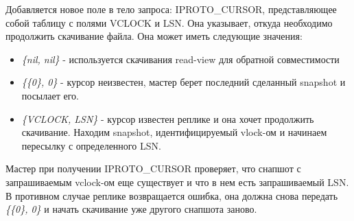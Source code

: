 Добавляется новое поле в тело запроса: IPROTO\_CURSOR, представляющее собой таблицу с полями VCLOCK и LSN. Она указывает, откуда необходимо продолжить скачивание файла. Она может иметь следующие значения:

\begin{itemize}
    \item \textit{\{nil, nil\}} - используется скачивания read-view для обратной совместимости
    \item \textit{\{\{0\}, 0\}} - курсор неизвестен, мастер берет последний сделанный snapshot и посылает его.
    \item \textit{\{VCLOCK, LSN\}} - курсор известен реплике и она хочет продолжить скачивание. Находим snapshot, идентифицируемый vlock-ом и начинаем пересылку с определенного LSN.
\end{itemize}

Мастер при получении IPROTO\_CURSOR проверяет, что снапшот с запрашиваемым vclock-ом еще существует и что в нем есть запрашиваемый LSN. В противном случае реплике возвращается ошибка, она должна снова передать \textit{\{\{0\}, 0\}} и начать скачивание уже другого снапшота заново.
